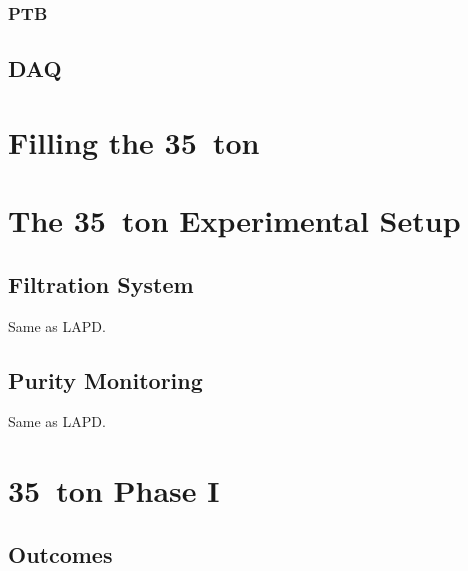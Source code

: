 \subsubsection{PTB}\label{sec:35tonPTB}

\subsection{DAQ}\label{sec:35tonDAQ}

\section{Filling the 35~ton}\label{sec:35tonFilling}

\section{The 35~ton Experimental Setup}\label{sec:35tonExperiment}

\subsection{Filtration System}\label{sec:35tonFiltration}

Same as LAPD.

\subsection{Purity Monitoring}\label{sec:35tonPurity}

Same as LAPD.

\section{35~ton Phase I}\label{sec:35tonPhaseI}

\subsection{Outcomes}\label{sec:35tonPhaseIOutcomes}

